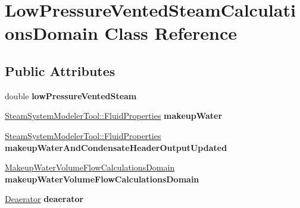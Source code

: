 \hypertarget{class_low_pressure_vented_steam_calculations_domain}{}\section{Low\+Pressure\+Vented\+Steam\+Calculations\+Domain Class Reference}
\label{class_low_pressure_vented_steam_calculations_domain}
\subsection*{Public Attributes}
\begin{DoxyCompactItemize}
\item 
\mbox{\label{class_low_pressure_vented_steam_calculations_domain_a180c96dc6afe48db1d3f09da2d1e5ab5}} 
double {\bfseries low\+Pressure\+Vented\+Steam}
\item 
\mbox{\label{class_low_pressure_vented_steam_calculations_domain_a2a0fa255430fad0a4676b888437ff05b}} 
\hyperlink{struct_steam_system_modeler_tool_1_1_fluid_properties}{Steam\+System\+Modeler\+Tool\+::\+Fluid\+Properties} {\bfseries makeup\+Water}
\item 
\mbox{\label{class_low_pressure_vented_steam_calculations_domain_a38de11af15360e7503c4e59e468c6a70}} 
\hyperlink{struct_steam_system_modeler_tool_1_1_fluid_properties}{Steam\+System\+Modeler\+Tool\+::\+Fluid\+Properties} {\bfseries makeup\+Water\+And\+Condensate\+Header\+Output\+Updated}
\item 
\mbox{\label{class_low_pressure_vented_steam_calculations_domain_ac1d10dc343c2eaeeab558e2af8ce5a2d}} 
\hyperlink{class_makeup_water_volume_flow_calculations_domain}{Makeup\+Water\+Volume\+Flow\+Calculations\+Domain} {\bfseries makeup\+Water\+Volume\+Flow\+Calculations\+Domain}
\item 
\mbox{\label{class_low_pressure_vented_steam_calculations_domain_a81a3f59a0d2de4fbc3d617ab6af60c47}} 
\hyperlink{class_deaerator}{Deaerator} {\bfseries deaerator}
\end{DoxyCompactItemize}
